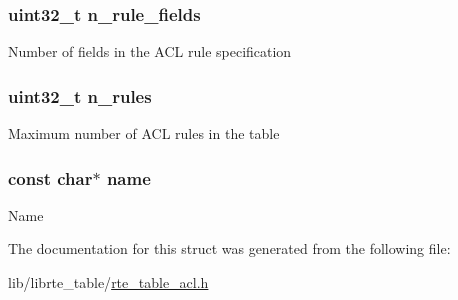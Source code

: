 \subsubsection[{n\+\_\+rule\+\_\+fields}]{\setlength{\rightskip}{0pt plus 5cm}uint32\+\_\+t n\+\_\+rule\+\_\+fields}\label{structrte__table__acl__params_ab640a2a844808a4b7fbe56dfc12c665c}
Number of fields in the A\+C\+L rule specification \hypertarget{structrte__table__acl__params_a36f832c0360005ce685ffab87c3e188a}{}
\subsubsection[{n\+\_\+rules}]{\setlength{\rightskip}{0pt plus 5cm}uint32\+\_\+t n\+\_\+rules}\label{structrte__table__acl__params_a36f832c0360005ce685ffab87c3e188a}
Maximum number of A\+C\+L rules in the table \hypertarget{structrte__table__acl__params_a8f8f80d37794cde9472343e4487ba3eb}{}
\subsubsection[{name}]{\setlength{\rightskip}{0pt plus 5cm}const char$\ast$ name}\label{structrte__table__acl__params_a8f8f80d37794cde9472343e4487ba3eb}
Name 

The documentation for this struct was generated from the following file\+:\begin{DoxyCompactItemize}
\item 
lib/librte\+\_\+table/\hyperlink{rte__table__acl_8h}{rte\+\_\+table\+\_\+acl.\+h}\end{DoxyCompactItemize}
